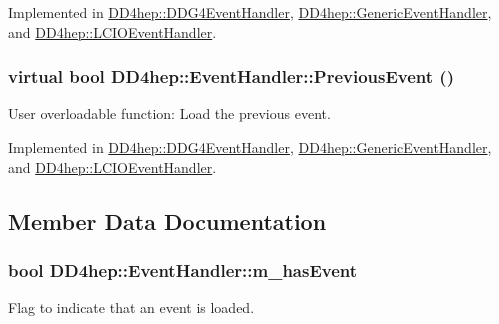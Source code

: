 Implemented in \hyperlink{class_d_d4hep_1_1_d_d_g4_event_handler_a110e487b2813985f56058382357f0754}{DD4hep::DDG4EventHandler}, \hyperlink{class_d_d4hep_1_1_generic_event_handler_a2ad81c03ef6feac9bf399ccd5928da41}{DD4hep::GenericEventHandler}, and \hyperlink{class_d_d4hep_1_1_l_c_i_o_event_handler_a67214b5a7675de7d634ac7c1d0cd2c7c}{DD4hep::LCIOEventHandler}.\hypertarget{class_d_d4hep_1_1_event_handler_a0942608bebbdd107c9dedbdc7311791f}{
\subsubsection[{PreviousEvent}]{\setlength{\rightskip}{0pt plus 5cm}virtual bool DD4hep::EventHandler::PreviousEvent ()}}
\label{class_d_d4hep_1_1_event_handler_a0942608bebbdd107c9dedbdc7311791f}


User overloadable function: Load the previous event. 

Implemented in \hyperlink{class_d_d4hep_1_1_d_d_g4_event_handler_a20cafa8eac655886d4a3d69338e7e947}{DD4hep::DDG4EventHandler}, \hyperlink{class_d_d4hep_1_1_generic_event_handler_a4b833d9537c7c29b0bfb0d567f98d0a3}{DD4hep::GenericEventHandler}, and \hyperlink{class_d_d4hep_1_1_l_c_i_o_event_handler_a178458d67dd58d3f5d701795fcadcd2e}{DD4hep::LCIOEventHandler}.

\subsection{Member Data Documentation}
\hypertarget{class_d_d4hep_1_1_event_handler_adccb4980638cdc1ed7792ae8583f1370}{
\subsubsection[{m\_\-hasEvent}]{\setlength{\rightskip}{0pt plus 5cm}bool {\bf DD4hep::EventHandler::m\_\-hasEvent}}}
\label{class_d_d4hep_1_1_event_handler_adccb4980638cdc1ed7792ae8583f1370}


Flag to indicate that an event is loaded. 

